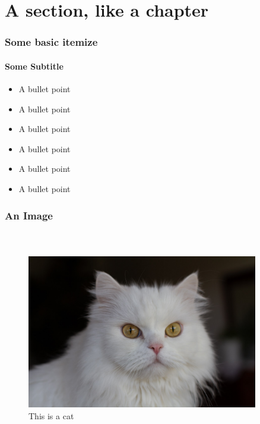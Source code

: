 

\section{A section, like a chapter}

\begin{frame}
\frametitle{Some basic itemize}
\framesubtitle{Some Subtitle}

\begin{itemize}
\item A bullet point \chck
\item A bullet point  
\item A bullet point  
\item A bullet point  
\item A bullet point  
\item A bullet point  
\end{itemize}
\end{frame}



\begin{frame}
\frametitle{An Image}
\framesubtitle{~}

\begin{center}
\begin{figure}
\includegraphics[width=0.9\textwidth]{Images/testimage}
\caption{This is a cat}\label{fig:cat}
\end{figure}
\end{center}

\end{frame}



